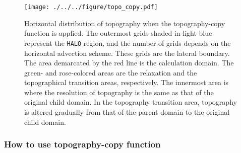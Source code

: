 \begin{figure}[tbh]
\begin{center}
  \texttt{[image: ./../../figure/topo\_copy.pdf]}\\
  \caption{Horizontal distribution of topography when the topography-copy function is applied.
    The outermost grids shaded in light blue represent the \texttt{HALO} region, and the number of grids depends on
    the horizontal advection scheme.
    These grids are the lateral boundary. The area demarcated by the red line is the calculation domain.
    The green- and rose-colored areas are the relaxation and the topographical transition areas, respectively.
    The innermost area is where the resolution of topography is the same as that of the original child domain.
    In the topography transition area, topography is altered gradually from that of
    the parent domain to the original child domain.
}
  \label{fig_topocopy}
\end{center}
\end{figure}



\subsubsection{How to use topography-copy function}


